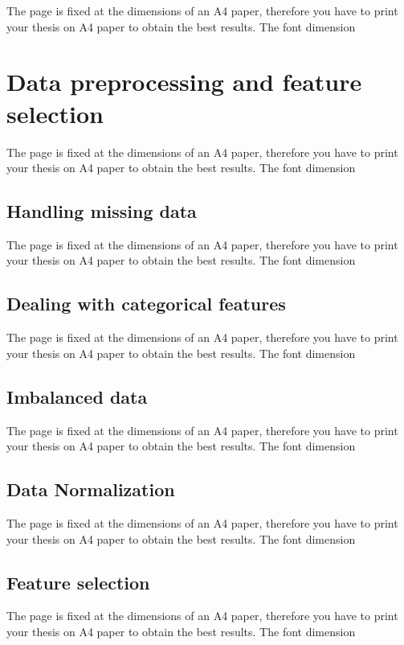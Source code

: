 \documentclass[LaM,binding=0.6cm, english]{sapthesis}
\begin{document}
The page is fixed at the dimensions of an A4 paper, therefore you have to print your thesis on A4 paper to obtain the best results. The font dimension

\section{Data preprocessing and feature selection}

The page is fixed at the dimensions of an A4 paper, therefore you have to print your thesis on A4 paper to obtain the best results. The font dimension

\subsection{Handling missing data}

The page is fixed at the dimensions of an A4 paper, therefore you have to print your thesis on A4 paper to obtain the best results. The font dimension

\subsection{Dealing with categorical features}

The page is fixed at the dimensions of an A4 paper, therefore you have to print your thesis on A4 paper to obtain the best results. The font dimension

\subsection{Imbalanced data}

The page is fixed at the dimensions of an A4 paper, therefore you have to print your thesis on A4 paper to obtain the best results. The font dimension

\subsection{Data Normalization}

The page is fixed at the dimensions of an A4 paper, therefore you have to print your thesis on A4 paper to obtain the best results. The font dimension

\subsection{Feature selection}

The page is fixed at the dimensions of an A4 paper, therefore you have to print your thesis on A4 paper to obtain the best results. The font dimension
\end{document}
